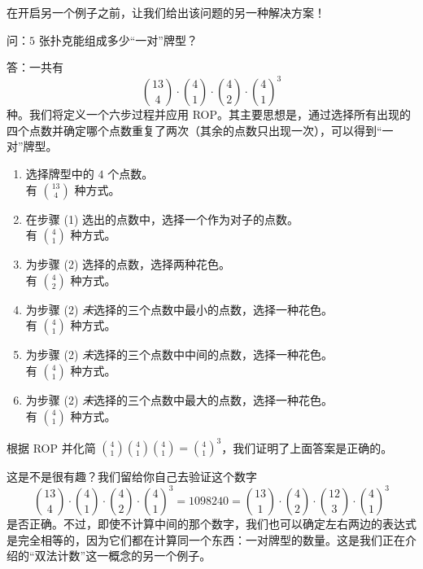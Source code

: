 \begin{example}[一对]
    在开启另一个例子之前，让我们给出该问题的另一种解决方案！

    \begin{questions}{问}：$5$ 张扑克能组成多少``一对''牌型？\end{questions}

    \begin{proofs}{答}：一共有
        \[{13 \choose 4} \cdot {4 \choose 1} \cdot {4 \choose 2} \cdot {4 \choose 1}^3\]
        种。我们将定义一个六步过程并应用 ROP。其主要思想是，通过选择所有出现的四个点数并确定哪个点数重复了两次（其余的点数只出现一次），可以得到``一对''牌型。
        \begin{enumerate}[label=(\arabic*)]
            \item 选择牌型中的 $4$ 个点数。\\
                  有 ${13 \choose 4}$ 种方式。
            \item 在步骤 (1) 选出的点数中，选择一个作为对子的点数。\\
                  有 ${4 \choose 1}$ 种方式。
            \item 为步骤 (2) 选择的点数，选择两种花色。\\
                  有 ${4 \choose 2}$ 种方式。
            \item 为步骤 (2) \emph{未}选择的三个点数中最小的点数，选择一种花色。\\
                  有 ${4 \choose 1}$ 种方式。
            \item 为步骤 (2) \emph{未}选择的三个点数中中间的点数，选择一种花色。\\
                  有 ${4 \choose 1}$ 种方式。
            \item 为步骤 (2) \emph{未}选择的三个点数中最大的点数，选择一种花色。\\
                  有 ${4 \choose 1}$ 种方式。
        \end{enumerate}
        根据 ROP 并化简 ${4 \choose 1}{4 \choose 1}{4 \choose 1}={4 \choose 1}^3$，我们证明了上面答案是正确的。
    \end{proofs}

    这是不是很有趣？我们留给你自己去验证这个数字
    \[{13 \choose 4} \cdot {4 \choose 1} \cdot {4 \choose 2} \cdot {4 \choose 1}^3 =  1098240 = {13 \choose 1} \cdot {4 \choose 2} \cdot {12 \choose 3} \cdot {4 \choose 1}^3\]
    是否正确。不过，即使不计算中间的那个数字，我们也可以确定左右两边的表达式是完全相等的，因为它们都在计算同一个东西：一对牌型的数量。这是我们正在介绍的``双法计数''这一概念的另一个例子。
\end{example}

